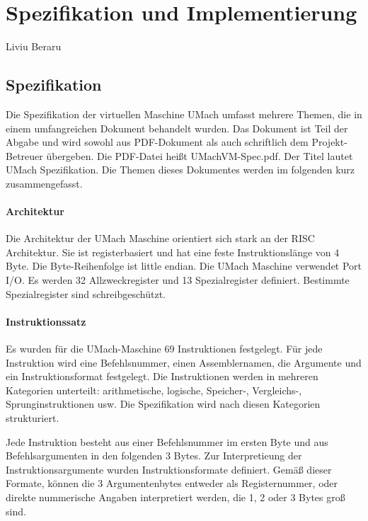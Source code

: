 \section{Spezifikation und Implementierung}
\begin{flushright}
Liviu Beraru
\end{flushright}

\subsection{Spezifikation}
Die Spezifikation der virtuellen Maschine UMach umfasst mehrere Themen, die in
einem umfangreichen Dokument behandelt wurden. Das Dokument ist Teil der Abgabe
und wird sowohl aus PDF-Dokument als auch schriftlich dem Projekt-Betreuer
übergeben. Die PDF-Datei heißt \glqq{}UMachVM-Spec.pdf\grqq{}. Der Titel lautet
\glqq{}UMach Spezifikation\grqq. Die Themen dieses Dokumentes werden im
folgenden kurz zusammengefasst.

\paragraph{Architektur}
Die Architektur der UMach Maschine orientiert sich stark an der RISC
Architektur. Sie ist registerbasiert und hat eine feste Instruktionslänge von 4
Byte. Die Byte-Reihenfolge ist \glqq{}little endian\grqq{}. Die UMach Maschine
verwendet Port I/O. Es werden 32 Allzweckregister und 13 Spezialregister
definiert. Bestimmte Spezialregister sind schreibgeschützt.



\paragraph{Instruktionssatz}
Es wurden für die UMach-Maschine 69 Instruktionen festgelegt. Für jede
Instruktion wird eine Befehlsnummer, einen Assemblernamen, die Argumente und ein
Instruktionsformat festgelegt. Die Instruktionen werden in mehreren Kategorien
unterteilt: arithmetische, logische, Speicher-, Vergleichs-, Sprunginstruktionen
usw. Die Spezifikation wird nach diesen Kategorien strukturiert.

Jede Instruktion besteht aus einer Befehlsnummer im ersten Byte und aus
Befehlsargumenten in den folgenden 3 Bytes. Zur Interpretieung der
Instruktionsargumente wurden Instruktionsformate definiert. Gemäß dieser
Formate, können die 3 Argumentenbytes entweder als Registernummer, oder direkte
nummerische Angaben interpretiert werden, die 1, 2 oder 3 Bytes groß sind.


